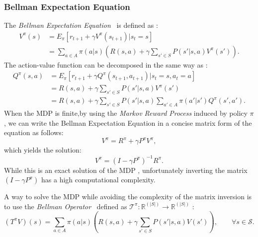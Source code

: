 \subsubsection*{Bellman Expectation Equation}
The \emph{Bellman Expectation Equation}~\cite{Bellman:DynamicProgramming} is defined as :
\begin{equation}
\begin{split}
	V^\pi(s) & =E_\pi \left[ r_{t+1} + \gamma V^{\pi}(s_{t+1})|s_t=s \right] \\
    	& =\sum_{a\in A} \pi (a|s) \left( R(s,a)+ \gamma \sum_{s'\in S} P(s'|s,a) V^\pi(s')\right).
\end{split}	
\end{equation}
The action-value function can be decomposed in the same way as :
\begin{equation}
\begin{split}
	Q^\pi(s,a) & =E_\pi \left[ r_{t+1}+ \gamma Q^\pi(s_{t+1},a_{t+1})|s_t=s,a_t=a \right] \\
    	& =R(s,a)+ \gamma \sum_{s'\in S} P(s'|s,a) V^\pi(s') \\
        & = R(s,a)+ \gamma \sum_{s'\in S} P(s'|s,a) \sum_{a'\in A} \pi(a'|s') Q^\pi(s',a').
\end{split}	
\end{equation}
When the MDP is finite,by using the \emph{ Markov Reward Process} induced by policy $\pi$, we can write the Bellman Expectation Equation in a concise matrix form of the equation as follows:
\begin{equation}
	V^\pi=R^\pi+\gamma P^\pi V^\pi,
\end{equation}
which yields the solution:
\begin{equation}
	\label{eq:mdp_closed_form_solution}
	V^\pi=\left(I-\gamma P^\pi \right)^{-1} R^\pi.
\end{equation}
While this is an exact solution of the MDP , unfortunately inverting the matrix $\left(I-\gamma P^\pi \right)$ has a high computational complexity.\par
A way to solve the MDP while avoiding the complexity of the matrix inversion is to use the \emph{Bellman  Operator}~\cite{Bellman:DynamicProgramming} defined as $\mathcal{T}^\pi :\mathbb{R}^{(|S|)} \rightarrow \mathbb{R}^{(|S|)}$ :
\begin{equation}
(T^\pi V)(s)=\sum_{a \in A} \pi(a|s)\left(R(s,a)+ \gamma \sum_{s'\in S} P(s'|s,a) V(s')\right), \qquad \forall s \in \mathcal{S}.
\end{equation}

